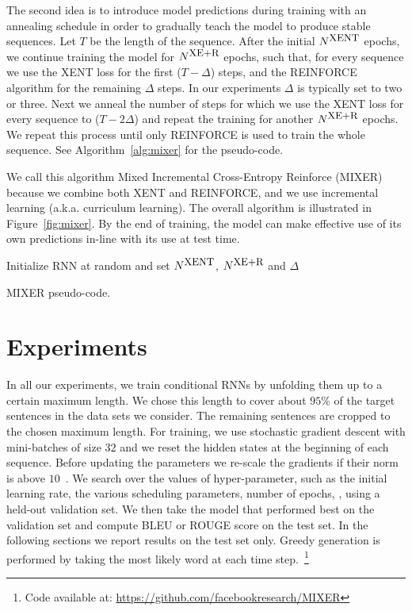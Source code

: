 \documentclass{article} \usepackage{iclr2016_conference,times}
\makeatletter
\newcommand*{\etc}{\@ifnextchar{.}{etc}{etc.\@\xspace}}
\makeatother
\begin{document}
The second idea is to introduce model predictions during training 
with an annealing schedule in order to gradually teach the model to produce stable sequences. 
Let $T$ be the length of the sequence.
After the initial $N^{\mbox{\small{XENT}}}$ epochs, we continue training the 
model for $N^{\mbox{\small{XE+R}}}$ epochs, such that, for every sequence 
we use the XENT loss for the first ($T - \Delta$) steps, and the REINFORCE algorithm 
for the remaining $\Delta$ steps.
In our experiments $\Delta$ is typically set to two or three. 
Next we anneal the number of steps for which we use the XENT loss for every sequence to  
($T - 2 \Delta$) and repeat the training for another $N^{\mbox{\small{XE+R}}}$ epochs. 
We repeat this process until only REINFORCE is used to train the whole sequence.
See Algorithm~\ref{alg:mixer} for the pseudo-code. 



We call this algorithm Mixed Incremental Cross-Entropy Reinforce (MIXER)
because we combine both XENT and REINFORCE, and we use incremental 
learning (a.k.a. curriculum learning). 
The overall algorithm is illustrated in Figure~\ref{fig:mixer}. 
By the end of training, the model can make effective use of its own 
predictions in-line with its use at test time.

\begin{algorithm}[t]
\footnotesize
 Initialize RNN at random and set $N^{\mbox{\small{XENT}}}$, $N^{\mbox{\small{XE+R}}}$
 and $\Delta$\; 
\caption{MIXER pseudo-code.}
 \label{alg:mixer}
\end{algorithm}
 \section{Experiments} \label{sec:experiments}
In all our experiments, we train conditional RNNs by unfolding them
up to a certain maximum length. 
We chose this length to cover about $95\%$ of the target sentences in the data sets we consider.
The remaining sentences are cropped to the chosen maximum length. 
For training, we use stochastic gradient descent
with mini-batches of size $32$ and we reset the hidden states at the
beginning of each sequence. Before updating the parameters we
re-scale the gradients if their norm is above $10$~\citep{mikolov-2010}.
We search over the values of hyper-parameter, such as the initial learning rate, 
the various scheduling parameters, number of epochs, \etc, using a held-out validation set. 
We then take the model that performed best on the validation set and compute BLEU or ROUGE 
score on the test set. In the following sections we report results on the test set only. 
Greedy generation is performed by taking the most likely word at each time step.~\footnote{Code available at: \url{https://github.com/facebookresearch/MIXER}} 
\end{document}
